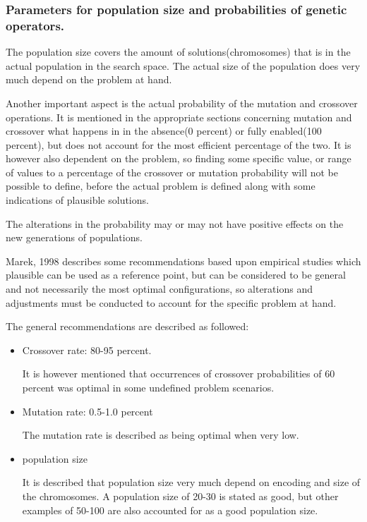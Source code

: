 \subsubsection{Parameters for population size and probabilities of genetic operators.}


The population size covers the amount of solutions(chromosomes) that is in the actual population in the search space. The actual size of the population does very much depend on the problem at hand.\cite[pp. 42]{Sivanandam2008}


Another important aspect is the actual probability of the mutation and crossover operations.
It is mentioned in the appropriate sections concerning mutation and crossover what happens in in the absence(0 percent) or fully enabled(100 percent), but does not account for the most efficient percentage of the two. It is however also dependent on the problem, so finding some specific value, or range of values to a percentage of the crossover or mutation probability will not be possible to define, before the actual problem is defined along with some indications of plausible solutions.

The alterations in the probability may or may not have positive effects on the new generations of populations.

Marek, 1998\cite{Marek1998}  describes some recommendations based upon empirical studies which plausible can be used as a reference point, but can be considered to be general and not necessarily the most optimal configurations, so alterations and adjustments must be conducted to account for the specific problem at hand.

The general recommendations are described as followed:
\begin{itemize}
\item Crossover rate: 80-95 percent.

It is however mentioned that occurrences of crossover probabilities of 60 percent was optimal in some undefined problem scenarios.
\item Mutation rate: 0.5-1.0 percent

The mutation rate is described as being optimal when very low.
\item population size

It is described that population size very much depend on encoding and size of the chromosomes. A population size of 20-30 is stated as good, but other examples of 50-100 are also accounted for as a good population size.
\end{itemize}


